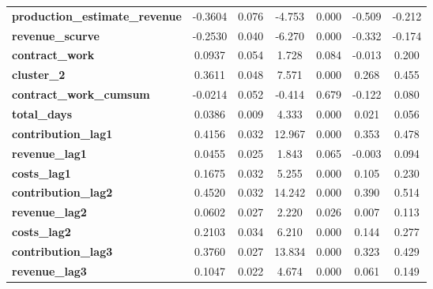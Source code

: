 \begin{center}
\begin{tabular}{lcccccc}
\textbf{production\_estimate\_revenue} &      -0.3604  &        0.076     &    -4.753  &         0.000        &       -0.509    &       -0.212     \\
\textbf{revenue\_scurve}               &      -0.2530  &        0.040     &    -6.270  &         0.000        &       -0.332    &       -0.174     \\
\textbf{contract\_work}                &       0.0937  &        0.054     &     1.728  &         0.084        &       -0.013    &        0.200     \\
\textbf{cluster\_2}                    &       0.3611  &        0.048     &     7.571  &         0.000        &        0.268    &        0.455     \\
\textbf{contract\_work\_cumsum}        &      -0.0214  &        0.052     &    -0.414  &         0.679        &       -0.122    &        0.080     \\
\textbf{total\_days}                   &       0.0386  &        0.009     &     4.333  &         0.000        &        0.021    &        0.056     \\
\textbf{contribution\_lag1}            &       0.4156  &        0.032     &    12.967  &         0.000        &        0.353    &        0.478     \\
\textbf{revenue\_lag1}                 &       0.0455  &        0.025     &     1.843  &         0.065        &       -0.003    &        0.094     \\
\textbf{costs\_lag1}                   &       0.1675  &        0.032     &     5.255  &         0.000        &        0.105    &        0.230     \\
\textbf{contribution\_lag2}            &       0.4520  &        0.032     &    14.242  &         0.000        &        0.390    &        0.514     \\
\textbf{revenue\_lag2}                 &       0.0602  &        0.027     &     2.220  &         0.026        &        0.007    &        0.113     \\
\textbf{costs\_lag2}                   &       0.2103  &        0.034     &     6.210  &         0.000        &        0.144    &        0.277     \\
\textbf{contribution\_lag3}            &       0.3760  &        0.027     &    13.834  &         0.000        &        0.323    &        0.429     \\
\textbf{revenue\_lag3}                 &       0.1047  &        0.022     &     4.674  &         0.000        &        0.061    &        0.149     \\

\end{tabular}
\end{center}
